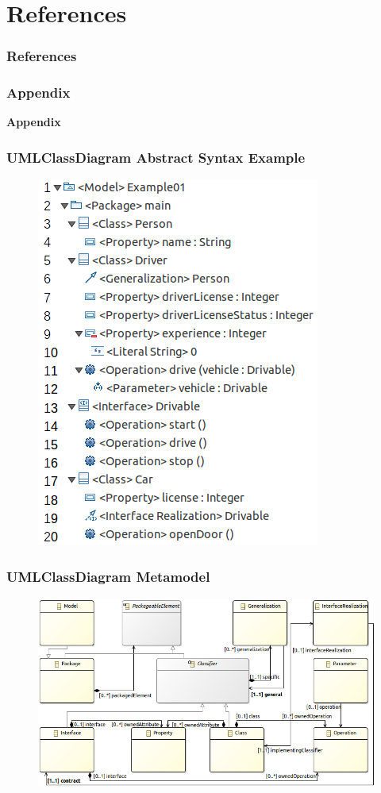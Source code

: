 \documentclass{beamer}
\begin{document}
\section{References}
\begin{frame}
	\frametitle{References}
	\tiny
	
	
\end{frame}

\appendix

\begin{frame}
	\frametitle{Appendix}
	\begin{center}
		{\LARGE \textbf{Appendix}}
	\end{center}
\end{frame}

\begin{frame}[t]
	\frametitle{UMLClassDiagram Abstract Syntax Example}
	\nocite{omg2007unified}
	\begin{figure}[H]
		\includegraphics[width=.45\textwidth]{umlClassDiagramExample01}
	\end{figure}
\end{frame}

\begin{frame}[t]
	\frametitle{UMLClassDiagram Metamodel}
	\begin{figure}[H]
		\includegraphics[width=\textwidth]{umlClassDiagramSimple01}
	\end{figure}
\end{frame}
\end{document}
